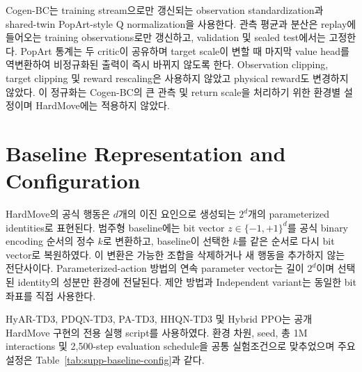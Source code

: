 \documentclass[10pt,journal]{IEEEtran}
\begin{document}
Cogen-BC는 training stream으로만 갱신되는 observation standardization과 shared-twin PopArt-style Q normalization을 사용한다. 관측 평균과 분산은 replay에 들어오는 training observations로만 갱신하고, validation 및 sealed test에서는 고정한다. PopArt 통계는 두 critic이 공유하며 target scale이 변할 때 마지막 value head를 역변환하여 비정규화된 출력이 즉시 바뀌지 않도록 한다. Observation clipping, target clipping 및 reward rescaling은 사용하지 않았고 physical reward도 변경하지 않았다. 이 정규화는 Cogen-BC의 큰 관측 및 return scale을 처리하기 위한 환경별 설정이며 HardMove에는 적용하지 않았다.

\section{Baseline Representation and Configuration}
\label{sec:baselines}

HardMove의 공식 행동은 $d$개의 이진 요인으로 생성되는 $2^d$개의 parameterized identities로 표현된다. 범주형 baseline에는 bit vector $z\in\{-1,+1\}^d$를 공식 binary encoding 순서의 정수 $k$로 변환하고, baseline이 선택한 $k$를 같은 순서로 다시 bit vector로 복원하였다. 이 변환은 가능한 조합을 삭제하거나 새 행동을 추가하지 않는 전단사이다. Parameterized-action 방법의 연속 parameter vector는 길이 $2^d$이며 선택된 identity의 성분만 환경에 전달된다. 제안 방법과 Independent variant는 동일한 bit 좌표를 직접 사용한다.

HyAR-TD3, PDQN-TD3, PA-TD3, HHQN-TD3 및 Hybrid PPO는 공개 HardMove 구현의 전용 실행 script를 사용하였다. 환경 차원, seed, 총 1M interactions 및 2,500-step evaluation schedule을 공통 실험조건으로 맞추었으며 주요 설정은 Table~\ref{tab:supp-baseline-config}과 같다.

\begin{table}[!t]
\centering
\caption{Principal settings for the HardMove baselines. A dash indicates that the item is not used by that algorithm.}
\label{tab:supp-baseline-config}
\end{table}
\end{document}
